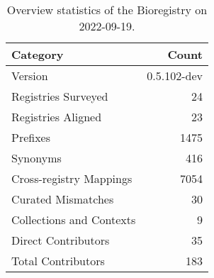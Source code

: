 \begin{table}
\centering
\caption{Overview statistics of the Bioregistry on 2022-09-19.}
\label{tab:bioregistry-summary}
\begin{tabular}{lr}
\toprule
                Category &       Count \\
\midrule
                 Version & 0.5.102-dev \\
     Registries Surveyed &          24 \\
      Registries Aligned &          23 \\
                Prefixes &        1475 \\
                Synonyms &         416 \\
 Cross-registry Mappings &        7054 \\
      Curated Mismatches &          30 \\
Collections and Contexts &           9 \\
     Direct Contributors &          35 \\
      Total Contributors &         183 \\
\bottomrule
\end{tabular}
\end{table}
